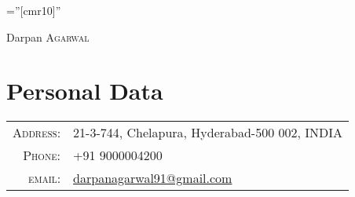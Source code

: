 \documentclass[a4paper,10pt]{article}
\begin{document}

\pagestyle{empty} %

\font\fb=''[cmr10]'' %

\par{\centering
		{\Huge Darpan \textsc{Agarwal}
	}\bigskip\par}

\section{Personal Data}

\begin{tabular}{rl}
    \textsc{Address:}   & 21-3-744, Chelapura, Hyderabad-500 002, INDIA
 \\
    \textsc{Phone:}     & +91 9000004200\\
    \textsc{email:}     & \href{mailto:darpanagarwal91@gmail.com}{darpanagarwal91@gmail.com}
\end{tabular}

\end{document}
